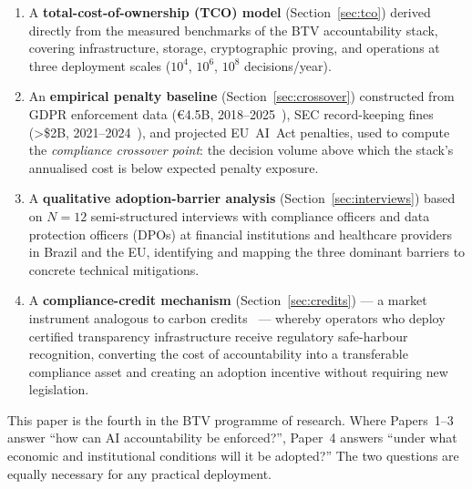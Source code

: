 \begin{enumerate}
  \item A \textbf{total-cost-of-ownership (TCO) model}
  (Section~\ref{sec:tco}) derived directly from the measured
  benchmarks of the BTV accountability stack, covering infrastructure,
  storage, cryptographic proving, and operations at three deployment
  scales ($10^4$, $10^6$, $10^8$ decisions/year).

  \item An \textbf{empirical penalty baseline}
  (Section~\ref{sec:crossover}) constructed from GDPR enforcement
  data (\euro{}4.5B, 2018--2025~\cite{gdpr-fines-2025}), SEC
  record-keeping fines (>\$2B, 2021--2024~\cite{sec-fines-2024}),
  and projected EU~AI~Act penalties, used to compute the
  \emph{compliance crossover point}: the decision volume above which
  the stack's annualised cost is below expected penalty exposure.

  \item A \textbf{qualitative adoption-barrier analysis}
  (Section~\ref{sec:interviews}) based on $N=12$ semi-structured
  interviews with compliance officers and data protection officers
  (DPOs) at financial institutions and healthcare providers in Brazil
  and the EU, identifying and mapping the three dominant barriers to
  concrete technical mitigations.

  \item A \textbf{compliance-credit mechanism}
  (Section~\ref{sec:credits}) --- a market instrument analogous to
  carbon credits~\cite{ellerman2010} --- whereby operators who deploy
  certified transparency infrastructure receive regulatory safe-harbour
  recognition, converting the cost of accountability into a
  transferable compliance asset and creating an adoption incentive
  without requiring new legislation.
\end{enumerate}

\noindent This paper is the fourth in the BTV programme of research.
Where Papers~1--3 answer ``how can AI accountability be enforced?'',
Paper~4 answers ``under what economic and institutional conditions will
it be adopted?'' The two questions are equally necessary for any
practical deployment.
